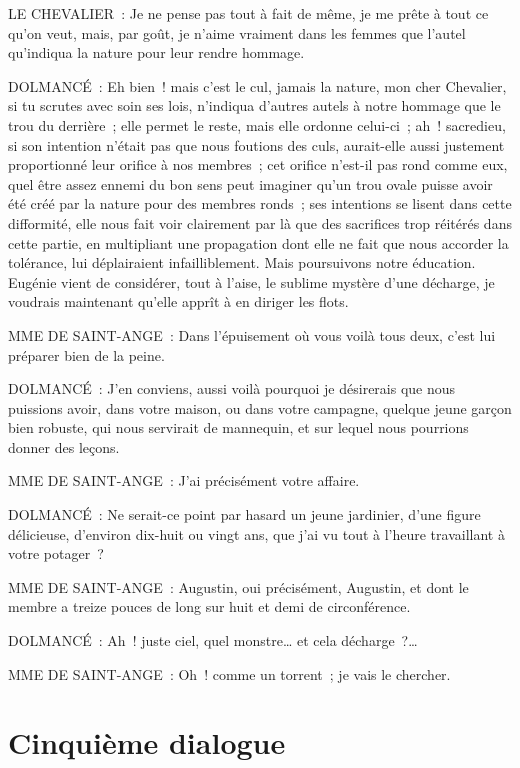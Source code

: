 \documentclass[french,twoside]{book} %
\begin{document}
LE CHEVALIER : Je ne pense pas tout à fait de même, je me prête à tout ce qu’on veut, mais, par goût, je n’aime vraiment dans les femmes que l’autel qu’indiqua la nature pour leur rendre hommage.\par
DOLMANCÉ : Eh bien ! mais c’est le cul, jamais la nature, mon cher Chevalier, si tu scrutes avec soin ses lois, n’indiqua d’autres autels à notre hommage que le trou du derrière ; elle permet le reste, mais elle ordonne celui-ci ; ah ! sacredieu, si son intention n’était pas que nous foutions des culs, aurait-elle aussi justement proportionné leur orifice à nos membres ; cet orifice n’est-il pas rond comme eux, quel être assez ennemi du bon sens peut imaginer qu’un trou ovale puisse avoir été créé par la nature pour des membres ronds ; ses intentions se lisent dans cette difformité, elle nous fait voir clairement par là que des sacrifices trop réitérés dans cette partie, en multipliant une propagation dont elle ne fait que nous accorder la tolérance, lui déplairaient infailliblement. Mais poursuivons notre éducation. Eugénie vient de considérer, tout à l’aise, le sublime mystère d’une décharge, je voudrais maintenant qu’elle apprît à en diriger les flots.\par
MME DE SAINT-ANGE : Dans l’épuisement où vous voilà tous deux, c’est lui préparer bien de la peine.\par
DOLMANCÉ : J’en conviens, aussi voilà pourquoi je désirerais que nous puissions avoir, dans votre maison, ou dans votre campagne, quelque jeune garçon bien robuste, qui nous servirait de mannequin, et sur lequel nous pourrions donner des leçons.\par
MME DE SAINT-ANGE : J’ai précisément votre affaire.\par
DOLMANCÉ : Ne serait-ce point par hasard un jeune jardinier, d’une figure délicieuse, d’environ dix-huit ou vingt ans, que j’ai vu tout à l’heure travaillant à votre potager ?\par
MME DE SAINT-ANGE : Augustin, oui précisément, Augustin, et dont le membre a treize pouces de long sur huit et demi de circonférence.\par
DOLMANCÉ : Ah ! juste ciel, quel monstre… et cela décharge ?…\par
MME DE SAINT-ANGE : Oh ! comme un torrent ; je vais le chercher.
\section[{Cinquième dialogue}]{Cinquième dialogue}
\label{d5}\renewcommand{\leftmark}{Cinquième dialogue}
\end{document}
